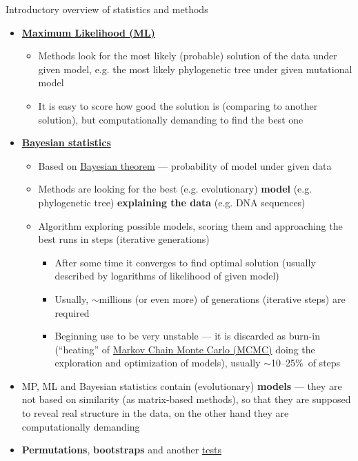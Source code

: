 \documentclass[compress, xelatex, 11pt, xcolor=svgnames, aspectratio=169,
	hyperref={
		bookmarks=true,
		unicode=true,
		colorlinks=true,
		pdftitle={Molecular data in R},
		plainpages=false,
		pdfauthor={Vojtech Zeisek},
		pdfsubject={Course about phylogeny and evolution in R},
		pdfcreator={XeLaTeX},
		pdfkeywords={R, evolution, phylogeny, molecular data},
		linkcolor=Crimson, %
		anchorcolor=Magenta, %
		citecolor=Magenta, %
		filecolor=Magenta, %
		menucolor=Magenta, %
		urlcolor=DodgerBlue, %
		},
	url={hyphens, lowtilde} %
	]{beamer}
\begin{document}
\begin{frame}[allowframebreaks]{Introductory overview of statistics and methods}
\begin{itemize}
		\item \textbf{\href{https://en.wikipedia.org/wiki/Maximum_likelihood_estimation}{Maximum Likelihood (ML)}}
		\begin{itemize}
			\item Methods look for the most likely (probable) solution of the data under given model, e.g. the most likely phylogenetic tree under given mutational model
			\item It is easy to score how good the solution is (comparing to another solution), but computationally demanding to find the best one
		\end{itemize}
		\item \textbf{\href{https://en.wikipedia.org/wiki/Bayesian_statistics}{Bayesian statistics}}
		\begin{itemize}
			\item Based on \href{https://en.wikipedia.org/wiki/Bayes_theorem}{Bayesian theorem} --- probability of model under given data
			\item Methods are looking for the best (e.g. evolutionary) \textbf{model} (e.g. phylogenetic tree) \textbf{explaining the data} (e.g. DNA sequences)
			\item Algorithm exploring possible models, scoring them and approaching the best runs in steps (iterative generations)
			\begin{itemize}
				\item After some time it converges to find optimal solution (usually described by logarithms of likelihood of given model)
				\item Usually, $\sim$millions (or even more) of generations (iterative steps) are required
				\item Beginning use to be very unstable --- it is discarded as burn-in (\enquote{heating} of \href{https://en.wikipedia.org/wiki/Markov_chain_Monte_Carlo}{Markov Chain Monte Carlo (MCMC)} doing the exploration and optimization of models), usually $\sim$10--25\%~of steps
			\end{itemize}
		\end{itemize}
		\item MP, ML and Bayesian statistics contain (evolutionary) \textbf{models} --- they are not based on similarity (as matrix-based methods), so that they are supposed to reveal real structure in the data, on the other hand they are computationally demanding
		\item \textbf{Permutations}, \textbf{bootstraps} and another \href{https://en.wikipedia.org/wiki/Resampling_(statistics)}{tests}

\end{itemize}
\end{frame}
\end{document}
